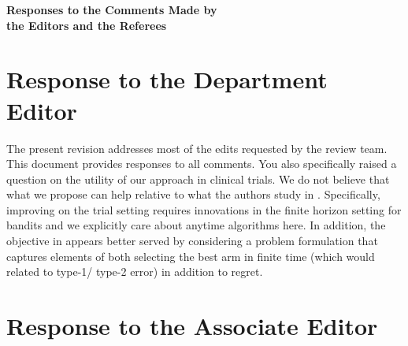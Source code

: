 \documentclass[11pt]{article}
\newcommand{\1}{\ensuremath{\mathbf{1}}} %
\theoremstyle{thm-sf}
\begin{document}
	\begin{center} {\Large {\sffamily\bfseries Responses to the Comments Made by \\
				the Editors and the Referees}}
	\end{center}
	
	\bigskip
	
	\section{Response to the Department Editor}
	
	The present revision addresses most of the edits requested by the review team. This document provides responses to all comments. You also specifically raised a question on the utility of our approach in clinical trials. We do not believe that what we propose can help relative to what the authors study in \citep{villar2015multi}. Specifically, improving on the trial setting requires innovations in the finite horizon setting for bandits and we explicitly care about anytime algorithms here. In addition, the objective in \cite{villar2015multi} appears better served by considering a problem formulation that captures elements of both selecting the best arm in finite time (which would related to type-1/ type-2 error) in addition to regret.  
	
	\section{Response to the Associate Editor}
	
\end{document}
